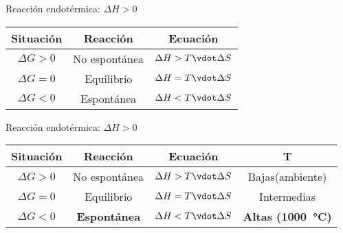 \begin{frame}
{\begin{overprint}
\begin{center}
\begin{tabular}{ccc}
                        \bottomrule
                    \end{tabular}
                \end{center}
                \alert{Reacción endotérmica:} $\Delta H > 0$
                \begin{center}
                    \begin{tabular}{ccc}
                        \toprule
                        Situación    & Reacción      & Ecuación                    \\
                        \midrule
                        $\Delta G>0$ & No espontánea & $\Delta H > T\vdot\Delta S$ \\
                        $\Delta G=0$ & Equilibrio    & $\Delta H = T\vdot\Delta S$ \\
                        $\Delta G<0$ & Espontánea    & $\Delta H < T\vdot\Delta S$ \\
                        \bottomrule
                    \end{tabular}
                \end{center}
                \alert{Reacción endotérmica:} $\Delta H > 0$
                \begin{center}
                    \begin{tabular}{cccc}
                        \toprule
                        Situación    & Reacción               & Ecuación                    & T                                    \\
                        \midrule
                        $\Delta G>0$ & No espontánea          & $\Delta H > T\vdot\Delta S$ & Bajas(ambiente)                      \\
                        $\Delta G=0$ & Equilibrio             & $\Delta H = T\vdot\Delta S$ & Intermedias                          \\
                        $\Delta G<0$ & \textbf{Espontánea}    & $\Delta H < T\vdot\Delta S$ & \textbf{Altas (\SI{1000}{\celsius})} \\
                        \bottomrule
                    \end{tabular}
                \end{center}
        \end{overprint}
                }
\end{frame}
